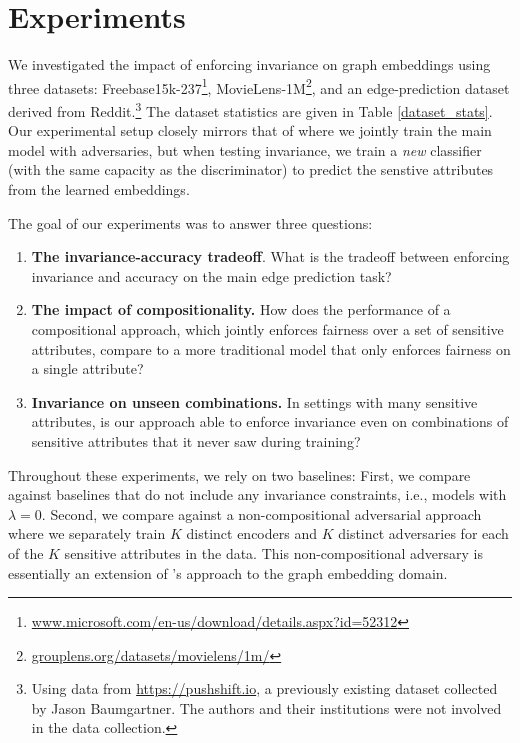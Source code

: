\section{Experiments}\label{sec:experiments}

We investigated the impact of enforcing invariance on graph embeddings using three  datasets: Freebase15k-237\footnote{\tiny{\url{www.microsoft.com/en-us/download/details.aspx?id=52312}}}, MovieLens-1M\footnote{\tiny{\url{grouplens.org/datasets/movielens/1m/}}}, and an edge-prediction dataset derived from Reddit.\footnote{\tiny Using data from \url{ https://pushshift.io}, a previously existing dataset collected by Jason Baumgartner. The authors and their institutions were not involved in the data collection.} The dataset statistics are given in Table \ref{dataset_stats}. Our experimental setup closely mirrors that of \cite{madras2018learning} where we jointly train the main model with adversaries, but when testing invariance, we train a \textit{new} classifier (with the same capacity as the discriminator) to predict the senstive attributes from the learned embeddings.

The goal of our experiments was to answer three questions:
\begin{enumerate}[label={(\bf Q\arabic*)}, topsep=0pt, parsep=0pt, leftmargin=25pt, itemsep=2pt]
    \item \textbf{The invariance-accuracy tradeoff}. What is the tradeoff between enforcing invariance and accuracy on the main edge prediction task?
    \item \textbf{The impact of compositionality.} How does the performance of a compositional approach, which jointly enforces fairness over a set of sensitive attributes, compare to a more traditional model that only enforces fairness on a single attribute?
    \item \textbf{Invariance on unseen combinations.} In settings with many sensitive attributes, is our approach able to enforce invariance even on combinations of sensitive attributes that it never saw during training? 
\end{enumerate}
Throughout these experiments, we rely on two  baselines: First, we compare against baselines that do not include any invariance constraints, i.e., models with $\lambda=0$.
Second, we compare against a non-compositional adversarial approach where we separately train $K$ distinct encoders and $K$ distinct adversaries for each of the $K$ sensitive attributes in the data. 
This non-compositional adversary is essentially an extension of \citet{edwards2015censoring}'s approach to the graph embedding domain. 

